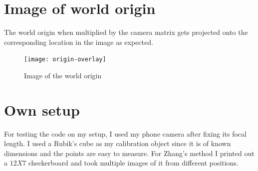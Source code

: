 \documentclass[a4paper,11pt]{article}
\begin{document}
 \section{Image of world origin}
 The world origin when multiplied by the camera matrix gets projected onto the corresponding location in the image as expected.
  \begin{figure}[H]
  \centering
  \texttt{[image: origin-overlay]}
  \caption{Image of the world origin}
 \end{figure}
 \section{Own setup}
  For testing the code on my setup, I used my phone camera after fixing its focal length. I used a Rubik's cube as my calibration object since it is of known dimensions and the points are easy to measure. For Zhang's method I printed out a $12 X 7$ checkerboard and took multiple images of it from different positions.
  
\end{document}
